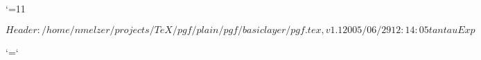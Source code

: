 %

\edef\pgfatcode{\the\catcode`\@}
\catcode`\@=11



\ProvidesPackageRCS $Header: /home/nmelzer/projects/TeX/pgf/plain/pgf/basiclayer/pgf.tex,v 1.1 2005/06/29 12:14:05 tantau Exp $






\catcode`\@=\pgfatcode

\endinput
